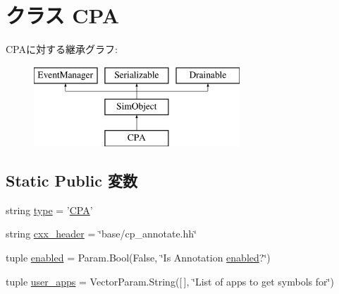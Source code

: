 \hypertarget{classCPA_1_1CPA}{
\section{クラス CPA}
\label{classCPA_1_1CPA}
}
CPAに対する継承グラフ:\begin{figure}[H]
\begin{center}
\leavevmode
\includegraphics[height=3cm]{classCPA_1_1CPA}
\end{center}
\end{figure}
\subsection*{Static Public 変数}
\begin{DoxyCompactItemize}
\item 
string \hyperlink{classCPA_1_1CPA_acce15679d830831b0bbe8ebc2a60b2ca}{type} = '\hyperlink{classCPA_1_1CPA}{CPA}'
\item 
string \hyperlink{classCPA_1_1CPA_a17da7064bc5c518791f0c891eff05fda}{cxx\_\-header} = \char`\"{}base/cp\_\-annotate.hh\char`\"{}
\item 
tuple \hyperlink{classCPA_1_1CPA_a3c61e7ae7e28cc6dc15dae82fbc92158}{enabled} = Param.Bool(False, \char`\"{}Is Annotation \hyperlink{classCPA_1_1CPA_a3c61e7ae7e28cc6dc15dae82fbc92158}{enabled}?\char`\"{})
\item 
tuple \hyperlink{classCPA_1_1CPA_a56430a394857d63e6a4dbb74556dd7bc}{user\_\-apps} = VectorParam.String(\mbox{[}$\,$\mbox{]}, \char`\"{}List of apps to get symbols for\char`\"{})
\end{DoxyCompactItemize}


